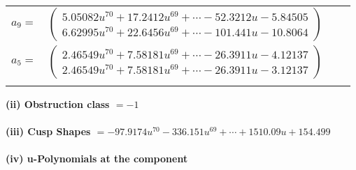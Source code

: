 \documentclass[1p]{elsarticle_modified}
\theoremstyle{definition}
\begin{document}
\begin{tabular}{m{7pt} m{180pt} m{7pt} m{180pt} }
\flushright $a_{9}=$&$\begin{pmatrix}5.05082 u^{70}+17.2412 u^{69}+\cdots-52.3212 u-5.84505\\6.62995 u^{70}+22.6456 u^{69}+\cdots-101.441 u-10.8064\end{pmatrix}$ \\
\flushright $a_{5}=$&$\begin{pmatrix}2.46549 u^{70}+7.58181 u^{69}+\cdots-26.3911 u-4.12137\\2.46549 u^{70}+7.58181 u^{69}+\cdots-26.3911 u-3.12137\end{pmatrix}$\\&\end{tabular}
\flushleft \textbf{(ii) Obstruction class $= -1$}\\~\\
\flushleft \textbf{(iii) Cusp Shapes $= -97.9174 u^{70}-336.151 u^{69}+\cdots+1510.09 u+154.499$}\\~\\
\newpage\renewcommand{\arraystretch}{1}
\flushleft \textbf{(iv) u-Polynomials at the component}\newline \\
\end{document}
